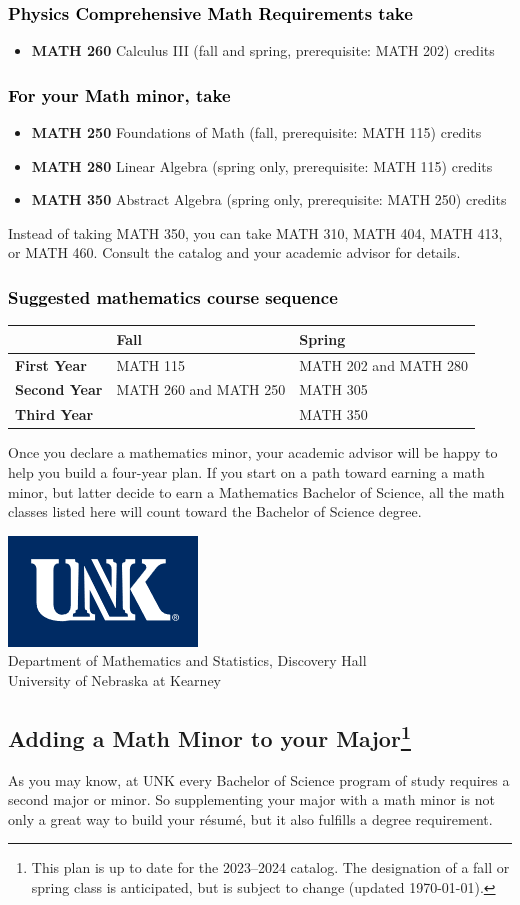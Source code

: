 \documentclass[10pt]{article}
\newcommand{\calconeshort}{MATH 115}
\newcommand{\calctwoshort}{MATH 202}
\newcommand{\foundations}{\textbf{MATH 250} Foundations of Math (fall, prerequisite: MATH 115)  \dotfill 3 credits}
\newcommand{\foundationsshort}{MATH 250}
\newcommand{\calcthree}{\textbf{MATH 260} Calculus III  (fall and spring, prerequisite: MATH 202) \dotfill 5 credits}
\newcommand{\calcthreeshort}{MATH 260}
\newcommand{\linear}{\textbf{MATH 280} Linear Algebra (spring only, prerequisite: MATH 115) \dotfill 3 credits}
\newcommand{\linearshort}{MATH 280}
\newcommand{\discreteshort}{MATH 413}
\newcommand{\diffeqshort}{MATH 305}
\newcommand{\abstractalgebra}{\textbf{MATH 350}	Abstract Algebra (spring only, prerequisite: MATH 250) \dotfill 	3 credits}
\newcommand{\abstractalgebrashort}{MATH 350}
\newcommand{\advancedcalcshort}{MATH 460}
\newcommand{\collegegeometryshort}{MATH 310}
\newcommand{\numbertheoryshort}{MATH 404}
\newcommand{\catalog}{2023--2024 }
\newcommand{\myfootnote}{\footnote{This plan is up to date for  the \catalog catalog. The designation of a fall or spring class is 
anticipated, but  is subject to change (updated \today).}}
\newcommand{\myheading}{
\begin{flushleft}
\includegraphics[scale=0.35]{unk-logo}\\
\setcounter{footnote}{0}
\vspace{0.25in}
 \textcolor{unkblue}{Department of Mathematics and Statistics, Discovery Hall} \\
  \textcolor{unkblue}{University of Nebraska at Kearney}
\end{flushleft}}
\newcommand{\mathminorALT}{
   \begin{tabular}[h]{| l | l | l|} 
      \hline
                 & \textbf{Fall}         &  \textbf{Spring}  \\ \hline 
      \textbf{First Year} & \calconeshort & \calctwoshort{} and \linearshort  \\  \hline
      \textbf{Second Year} &  \calcthreeshort{} and  \foundationsshort{}  & \diffeqshort \\ \hline
      \textbf{Third Year} &             &  \abstractalgebrashort \\ \hline
      \end{tabular}}
\begin{document}
\subsubsection*{\textcolor{black}{Physics Comprehensive Math Requirements take}}
\begin{itemize}
 \item \calcthree
\end{itemize}

\subsubsection*{\textcolor{black}{For your Math minor, take}}
\begin{itemize}
\item \foundations
\item \linear
\item \abstractalgebra
\end{itemize}
Instead of taking \abstractalgebrashort{}, you can take \collegegeometryshort{}, \numbertheoryshort{}, \discreteshort{}, or \advancedcalcshort{}.  Consult the catalog and your academic advisor for details.

\subsubsection*{\textcolor{black}{Suggested mathematics course sequence}}

\mathminorALT

\vspace{0.1in}
  

 \noindent Once you declare a mathematics minor, your academic advisor will be 
 happy to help you build a four-year plan. If you start on a path toward earning 
 a math minor, but latter decide to earn a  Mathematics Bachelor of Science, 
 all the math classes listed here will count toward the Bachelor of Science degree.




\newpage

\myheading

\subsection*{\textbf{\textcolor{unkblue}{Adding a Math Minor to your Major\myfootnote}}}

As you may know, at UNK every Bachelor of Science program of study requires a second
major or minor. So supplementing your major with a math minor is not only a great
way to build your r\'esum\'e, but it also fulfills a degree requirement.
\end{document}
